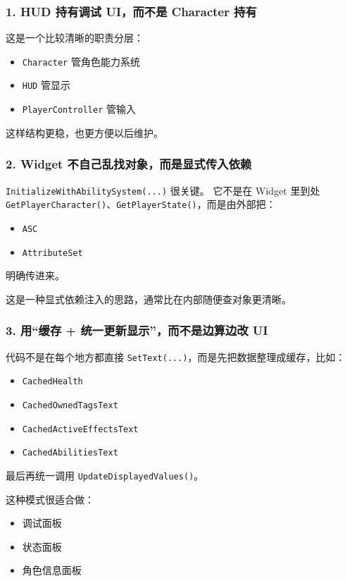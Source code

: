\subsubsection{1. HUD 持有调试 UI，而不是 Character 持有}
这是一个比较清晰的职责分层：

\begin{itemize}
	\item \texttt{Character} 管角色能力系统
	\item \texttt{HUD} 管显示
	\item \texttt{PlayerController} 管输入
\end{itemize}

这样结构更稳，也更方便以后维护。

\subsubsection{2. Widget 不自己乱找对象，而是显式传入依赖}
\texttt{InitializeWithAbilitySystem(...)} 很关键。  
它不是在 Widget 里到处 \texttt{GetPlayerCharacter()}、\texttt{GetPlayerState()}，而是由外部把：

\begin{itemize}
	\item \texttt{ASC}
	\item \texttt{AttributeSet}
\end{itemize}

明确传进来。

这是一种显式依赖注入的思路，通常比在内部随便查对象更清晰。

\subsubsection{3. 用“缓存 + 统一更新显示”，而不是边算边改 UI}
代码不是在每个地方都直接 \texttt{SetText(...)}，而是先把数据整理成缓存，比如：

\begin{itemize}
	\item \texttt{CachedHealth}
	\item \texttt{CachedOwnedTagsText}
	\item \texttt{CachedActiveEffectsText}
	\item \texttt{CachedAbilitiesText}
\end{itemize}

最后再统一调用 \texttt{UpdateDisplayedValues()}。

这种模式很适合做：

\begin{itemize}
	\item 调试面板
	\item 状态面板
	\item 角色信息面板
\end{itemize}

